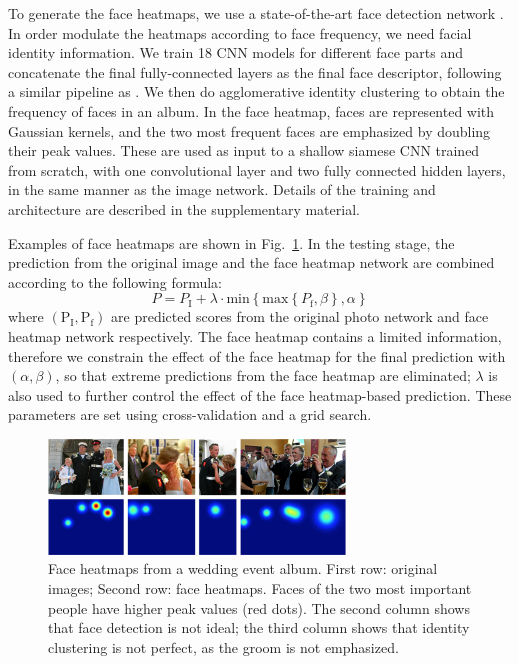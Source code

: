 \documentclass[10pt,twocolumn,letterpaper]{article}
\begin{document}
To generate the face heatmaps, we use a state-of-the-art face detection network \cite{Li_2015_CVPR}. In order modulate the heatmaps according to face frequency, we need facial identity information. We train 18 CNN models for different face parts and concatenate the final fully-connected layers as the final face descriptor, following a similar pipeline as \cite{Sun_2014_CVPR}. We then do agglomerative identity clustering to obtain the frequency of faces in an album. In the face heatmap, faces are represented  with Gaussian kernels, and the two most frequent faces are emphasized by doubling their peak values. These are used as input to a shallow siamese CNN trained from scratch, with one convolutional layer and two fully connected hidden layers, in the same manner as the image network. Details of the training and architecture are described in the supplementary material. 

Examples of face heatmaps are shown in Fig.~\ref{figure4}. In the testing stage, the prediction from the original image and the face heatmap network are combined according to the following formula:
\begin{equation}
P=P_{\text{I}} + {\lambda} \cdot \text{min}\left \{ \text{max}\left \{ P_{\text{f} }, \beta \right \},\alpha \right \}
\label{equa-face}
\end{equation}
where $(\text{P}_{\text{I}}, \text{P}_{\text{f}})$ are predicted scores from the original photo network and face heatmap network respectively. The face heatmap contains a limited information, therefore we constrain the effect of the face heatmap for the final prediction with $(\alpha, \beta)$, so that extreme predictions from the face heatmap are eliminated; $\lambda$ is also used to further control the effect of the face heatmap-based prediction. These parameters are set using cross-validation and a grid search.

\begin{figure}[h]
\begin{center}
\includegraphics[width=3.1in]{section3_1}
\end{center}
\caption{Face heatmaps from a wedding event album. First row: original images; Second row: face heatmaps. Faces of the two most important people have higher peak values (red dots). The second column shows that face detection is not ideal; the  third column shows that identity clustering is not perfect, as the groom is not emphasized.}
\vspace{-0.2in}
\label{figure4}
\end{figure}
\end{document}
